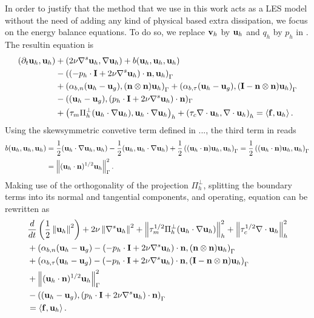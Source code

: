 In order to justify that the method that we use in this work acts as a LES model without the need of adding any kind of physical based extra dissipation, we focus on the energy balance equations. To do so, we replace $ {\bf v}_h $ by $ {\bf u}_h $ and $ q_h $ by $ p_h $ in . The resultin equation is
\begin{align}
\label{eq-C7_NS_ene_balance_1}
(\partial_t{\bf u}_h,{\bf u}_h)&+(2\nu\nabla^s{\bf u}_h,\nabla{\bf u}_h)+b({\bf u}_h,{\bf u}_h,{\bf u}_h)\\\nonumber
&-\left((-p_h\cdot\mathbf{I}+2\nu\nabla^s{\bf u}_h)\cdot{\bf n},{\bf u}_h\right)_\Gamma\\\nonumber&+\left(\alpha_{b,n}({\bf u}_h-{\bf u}_g),({\bf n}\otimes{\bf n}){\bf u}_h\right)_\Gamma+\left(\alpha_{b,\tau}({\bf u}_h-{\bf u}_g),(\mathbf{I}-{\bf n}\otimes{\bf n}){\bf u}_h\right)_\Gamma\\\nonumber
&-(({\bf u}_h-{\bf u}_g),(p_h\cdot\mathbf{I}+2\nu\nabla^s{\bf u}_h)\cdot{\bf n})_\Gamma\\\nonumber
&+\left(\tau_m\Pi_h^\perp({\bf u}_h\cdot\nabla{\bf u}_h),{\bf u}_h\cdot\nabla{\bf u}_h\right)_h+\left(\tau_c\nabla\cdot{\bf u}_h,\nabla\cdot{\bf u}_h\right)_h=\left\langle{\bf f},{\bf u}_h\right\rangle.
\end{align}
Using the skewsymmetric convetive term defined in ..., the third term in  reads
\begin{align*}
b({\bf u}_h,{\bf u}_h,{\bf u}_h)&=\frac{1}{2}({\bf u}_h\cdot\nabla{\bf u}_h,{\bf u}_h)-\frac{1}{2}({\bf u}_h,{\bf u}_h\cdot\nabla{\bf u}_h)+\frac{1}{2}\left(({\bf u}_h\cdot{\bf n}){\bf u}_h,{\bf u}_h\right)_\Gamma=\frac{1}{2}\left(({\bf u}_h\cdot{\bf n}){\bf u}_h,{\bf u}_h\right)_\Gamma\\
&=\left\|({\bf u}_h\cdot{\bf n})^{1/2}{\bf u}_h\right\|^2_\Gamma.
\end{align*}
Making use of the orthogonality of the projection $ \Pi_h^\perp $, splitting the boundary terms into its normal and tangential components, and operating, equation  can be rewritten as
\begin{align}
\label{eq-C7_NS_ene_balance_2}
&\frac{d}{dt}\left(\frac{1}{2}\left\|{\bf u}_h\right\|^2\right)+2\nu\left\|\nabla^s{\bf u}_h\right\|^2+\left\|\tau_m^{1/2}\Pi_h^\perp({\bf u}_h\cdot\nabla{\bf u}_h)\right\|^2_h+\left\|\tau_c^{1/2}\nabla\cdot{\bf u}_h\right\|^2_h\\\nonumber
&+\left(\alpha_{b,n}({\bf u}_h-{\bf u}_g)-(-p_h\cdot\mathbf{I}+2\nu\nabla^s{\bf u}_h)\cdot{\bf n},({\bf n}\otimes{\bf n}){\bf u}_h\right)_\Gamma\\\nonumber
&+\left(\alpha_{b,\tau}({\bf u}_h-{\bf u}_g)-(-p_h\cdot\mathbf{I}+2\nu\nabla^s{\bf u}_h)\cdot{\bf n},(\mathbf{I}-{\bf n}\otimes{\bf n}){\bf u}_h\right)_\Gamma\\\nonumber
&+\left\|({\bf u}_h\cdot{\bf n})^{1/2}{\bf u}_h\right\|^2_\Gamma\\\nonumber
&-\left(({\bf u}_h-{\bf u}_g),(p_h\cdot\mathbf{I}+2\nu\nabla^s{\bf u}_h)\cdot{\bf n}\right)_\Gamma\\\nonumber
&=\left\langle{\bf f},{\bf u}_h\right\rangle.
\end{align}
